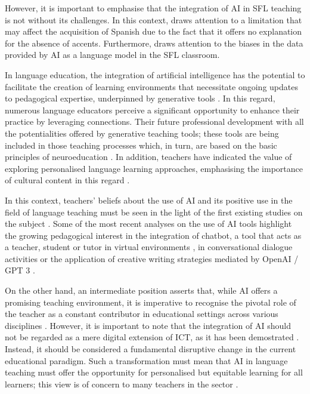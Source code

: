 \documentclass[english]{textolivre}
\begin{document}
However, it is important to emphasise that the integration of AI in SFL teaching is not without its challenges. In this context, \textcite{canales2024} draws attention to a limitation that may affect the acquisition of Spanish due to the fact that it offers no explanation for the absence of accents. Furthermore, \textcite{sandoval2024} draws attention to the biases in the data provided by AI as a language model in the SFL classroom.

In language education, the integration of artificial intelligence has the potential to facilitate the creation of learning environments that necessitate ongoing updates to pedagogical expertise, underpinned by generative tools \cite{ayala2023}. In this regard, numerous language educators perceive a significant opportunity to enhance their practice by leveraging connections. Their future professional development with all the potentialities offered by generative teaching tools; these tools are being included in those teaching processes which, in turn, are based on the basic principles of neuroeducation \cite{rodriguez2024, mondejar2023}. In addition, teachers have indicated the value of exploring personalised language learning approaches, emphasising the importance of cultural content in this regard \cite{briceno-nunez2024, munoz-basols2024}.

In this context, teachers' beliefs about the use of AI and its positive use in the field of language teaching must be seen in the light of the first existing studies on the subject \cite{zamora2024}. Some of the most recent analyses on the use of AI tools highlight the growing pedagogical interest in the integration of chatbot, a tool that acts as a teacher, student or tutor in virtual environments \cite{moreno-padilla2019}, in conversational dialogue activities \cite{guano2023, lucana2023, de-almeida-ferreira2024} or the application of creative writing strategies mediated by OpenAI / GPT 3 \cite{vicente-yague-jara2023}.

On the other hand, an intermediate position asserts that, while AI offers a promising teaching environment, it is imperative to recognise the pivotal role of the teacher as a constant contributor in educational settings across various disciplines \cite{martin-marchante2022, rodriguez2024}. However, it is important to note that the integration of AI should not be regarded as a mere digital extension of ICT, as it has been demostrated \cite{toutain2023gestion}. Instead, it should be considered a fundamental disruptive change in the current educational paradigm. Such a transformation must mean that AI in language teaching must offer the opportunity for personalised but equitable learning for all learners; this view is of concern to many teachers in the sector \cite{munoz-basols2024, vera2023}.
\end{document}
